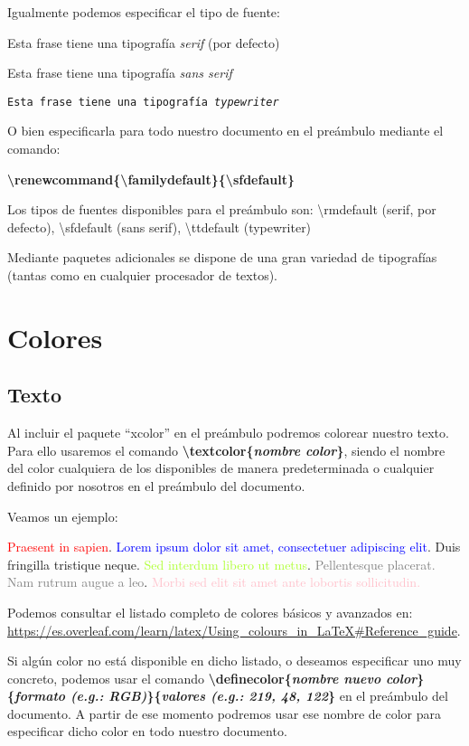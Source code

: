 \documentclass[12pt]{book} %
\begin{document}
Igualmente podemos especificar el tipo de fuente: 

\textrm{Esta frase tiene una tipografía \emph{serif} (por defecto)}

\textsf{Esta frase tiene una tipografía \emph{sans serif}}

\texttt{Esta frase tiene una tipografía \emph{typewriter}}

O bien especificarla para todo nuestro documento en el preámbulo mediante el comando: %

\textbf{\textbackslash renewcommand\{\textbackslash familydefault\}\{\textbackslash sfdefault\}}

Los tipos de fuentes disponibles para el preámbulo son: \textbackslash rmdefault (serif, por defecto), \textbackslash sfdefault (sans serif), \textbackslash ttdefault (typewriter)

Mediante paquetes adicionales se dispone de una gran variedad de tipografías (tantas como en cualquier procesador de textos).

\section{Colores}

\subsection{Texto}

Al incluir el paquete ``xcolor'' en el preámbulo podremos colorear  nuestro texto. Para ello usaremos el comando \textbf{\textbackslash textcolor\{\emph{nombre color}\}}, siendo el nombre del color cualquiera de los disponibles de manera predeterminada o cualquier definido por nosotros en el preámbulo del documento.

Veamos un ejemplo:

\textcolor{red}{Praesent in sapien}.
\textcolor{blue}{Lorem ipsum dolor sit amet, consectetuer 
adipiscing elit}.
\textcolor{TealBlue}{Duis fringilla tristique neque}.
\textcolor{GreenYellow}{Sed interdum libero ut metus}.
\textcolor{gray}{Pellentesque placerat. Nam rutrum augue a leo}. 
\textcolor{pink}{Morbi sed elit sit amet ante lobortis sollicitudin.}

Podemos consultar el listado completo de colores básicos y avanzados en: \url{https://es.overleaf.com/learn/latex/Using_colours_in_LaTeX#Reference_guide}.

Si algún color no está disponible en dicho listado, o deseamos especificar uno muy concreto, podemos usar el comando \textbf{\textbackslash definecolor\{\emph{nombre nuevo color}\}\{\emph{formato (e.g.: RGB)}\}\{\emph{valores (e.g.: 219, 48, 122}\}} en el preámbulo del documento. A partir de ese momento podremos usar ese nombre de color para especificar dicho color en todo nuestro documento.
\end{document}
